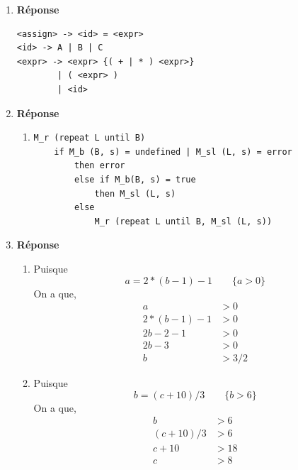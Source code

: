 \documentclass[12pt]{book}
\begin{document}
\begin{enumerate}
    \item \textbf{Réponse}
\begin{verbatim}
<assign> -> <id> = <expr>
<id> -> A | B | C
<expr> -> <expr> {( + | * ) <expr>}
        | ( <expr> )
        | <id>
\end{verbatim}

    \item \textbf{Réponse}
    \begin{enumerate}
        \item 
\begin{verbatim}
M_r (repeat L until B)
    if M_b (B, s) = undefined | M_sl (L, s) = error
        then error
        else if M_b(B, s) = true
            then M_sl (L, s)
        else
            M_r (repeat L until B, M_sl (L, s))
\end{verbatim}
\newpage
    \end{enumerate}
    
    \item \textbf{Réponse}
    \begin{enumerate}
        \item 
        Puisque $$a = 2 * (b - 1) - 1 \qquad \{a > 0\}$$ On a que,
        \begin{align*}
            a &> 0\\
            2 * (b - 1) - 1 &> 0\\
            2b - 2 - 1 &> 0\\
            2b - 3 &> 0\\
            b &> 3/2
        \end{align*}
        \item 
        Puisque $$b = (c+10) / 3  \qquad \{b > 6\}$$ On a que,
        \begin{align*}
            b &> 6\\
            (c+10) / 3 &> 6\\
            c + 10 &> 18\\
            c &> 8
        \end{align*}
    \end{enumerate}
    

\end{enumerate}
\end{document}
